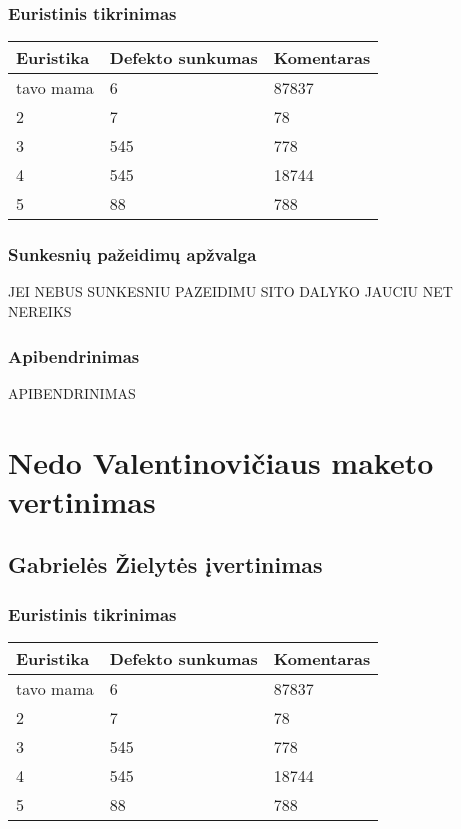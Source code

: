 \documentclass{VUMIFPSkursinis}
\begin{document}
\subsubsection{Euristinis tikrinimas}
\begin{center}
 \begin{tabular}{|| p{4cm} | p{4cm} | p{8cm} ||} 
 \hline
 Euristika & Defekto sunkumas & Komentaras \\
 \hline\hline
 tavo mama & 6 & 87837 \\ 
 \hline
 2 & 7 & 78 \\
 \hline
 3 & 545 & 778 \\
 \hline
 4 & 545 & 18744 \\
 \hline
 5 & 88 & 788 \\  %
 \hline                 %
\end{tabular}	
\end{center}

\subsubsection{Sunkesnių pažeidimų apžvalga}
JEI NEBUS SUNKESNIU PAZEIDIMU SITO DALYKO JAUCIU NET NEREIKS

\subsubsection{Apibendrinimas}
APIBENDRINIMAS

\section{Nedo Valentinovičiaus maketo vertinimas}
\subsection{Gabrielės Žielytės įvertinimas}
\subsubsection{Euristinis tikrinimas}
\begin{center}
 \begin{tabular}{|| p{4cm} | p{4cm} | p{8cm} ||} 
 \hline
 Euristika & Defekto sunkumas & Komentaras \\
 \hline\hline
 tavo mama & 6 & 87837 \\ 
 \hline
 2 & 7 & 78 \\
 \hline
 3 & 545 & 778 \\
 \hline
 4 & 545 & 18744 \\
 \hline
 5 & 88 & 788 \\  %
 \hline                 %
\end{tabular}	
\end{center}
\end{document}
